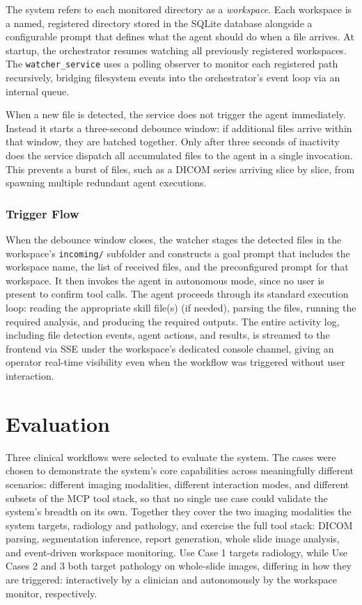 \documentclass[conference]{IEEEtran}
\begin{document}
The system refers to each monitored directory as a \textit{workspace}. Each workspace is a named, registered directory stored in the SQLite database alongside a configurable prompt that defines what the agent should do when a file arrives. At startup, the orchestrator resumes watching all previously registered workspaces.
The \texttt{watcher\_service} uses a polling observer to monitor each registered path recursively, bridging filesystem events into the orchestrator's event loop via an internal queue.

When a new file is detected, the service does not trigger the agent immediately. Instead it starts a three-second debounce window: if additional files arrive within that window, they are batched together. Only after three seconds of inactivity does the service dispatch all accumulated files to the agent in a single invocation. This prevents a burst of files, such as a DICOM series arriving slice by slice, from spawning multiple redundant agent executions.

\subsubsection{Trigger Flow}

When the debounce window closes, the watcher stages the detected files in the workspace's \texttt{incoming/} subfolder and constructs a goal prompt that includes the workspace name, the list of received files, and the preconfigured prompt for that workspace. It then invokes the agent in autonomous mode, since no user is present to confirm tool calls.
The agent proceeds through its standard execution loop: reading the appropriate skill file(s) (if needed), parsing the files, running the required analysis, and producing the required outputs. The entire activity log, including file detection events, agent actions, and results, is streamed to the frontend via SSE under the workspace's dedicated console channel, giving an operator real-time visibility even when the workflow was triggered without user interaction.


\section{Evaluation}
\label{sec:evaluation}

Three clinical workflows were selected to evaluate the system. The cases were chosen to demonstrate the system's core capabilities across meaningfully different scenarios: different imaging modalities, different interaction modes, and different subsets of the MCP tool stack, so that no single use case could validate the system's breadth on its own. Together they cover the two imaging modalities the system targets, radiology and pathology, and exercise the full tool stack: DICOM parsing, segmentation inference, report generation, whole slide image analysis, and event-driven workspace monitoring. Use Case 1 targets radiology, while Use Cases 2 and 3 both target pathology on whole-slide images, differing in how they are triggered: interactively by a clinician and autonomously by the workspace monitor, respectively.
\end{document}
